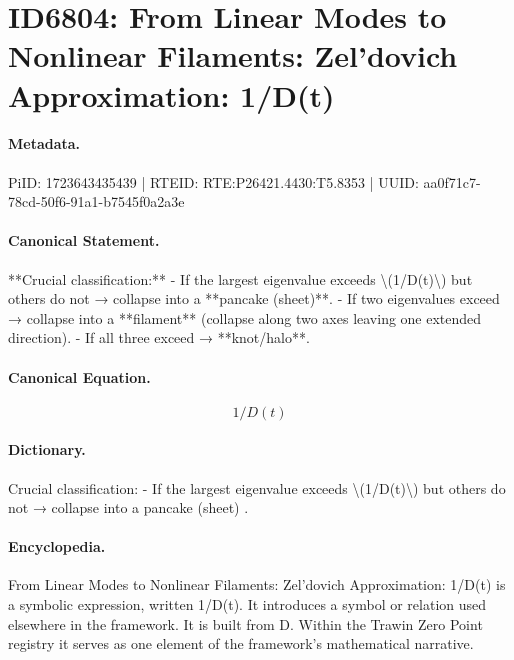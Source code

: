\section*{ID6804: From Linear Modes to Nonlinear Filaments: Zel’dovich Approximation: 1/D(t)}
\paragraph{Metadata.}
PiID: 1723643435439 | RTEID: RTE:P26421.4430:T5.8353 | UUID: aa0f71c7-78cd-50f6-91a1-b7545f0a2a3e

\paragraph{Canonical Statement.}
**Crucial classification:** - If the largest eigenvalue exceeds \textbackslash{}(1/D(t)\textbackslash{}) but others do not → collapse into a **pancake (sheet)**. - If two eigenvalues exceed → collapse into a **filament** (collapse along two axes leaving one extended direction). - If all three exceed → **knot/halo**.

\paragraph{Canonical Equation.}
\[
1/D(t)
\]

\paragraph{Dictionary.}
Crucial classification: - If the largest eigenvalue exceeds \textbackslash{}(1/D(t)\textbackslash{}) but others do not → collapse into a pancake (sheet) .

\paragraph{Encyclopedia.}
From Linear Modes to Nonlinear Filaments: Zel’dovich Approximation: 1/D(t) is a symbolic expression, written 1/D(t). It introduces a symbol or relation used elsewhere in the framework. It is built from D. Within the Trawin Zero Point registry it serves as one element of the framework's mathematical narrative.

